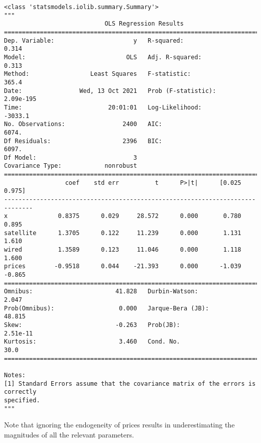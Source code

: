             \begin{tcolorbox}[breakable, size=fbox, boxrule=.5pt, pad at break*=1mm, opacityfill=0]
\begin{Verbatim}[commandchars=\\\{\}]
<class 'statsmodels.iolib.summary.Summary'>
"""
                            OLS Regression Results
==============================================================================
Dep. Variable:                      y   R-squared:                       0.314
Model:                            OLS   Adj. R-squared:                  0.313
Method:                 Least Squares   F-statistic:                     365.4
Date:                Wed, 13 Oct 2021   Prob (F-statistic):          2.09e-195
Time:                        20:01:01   Log-Likelihood:                -3033.1
No. Observations:                2400   AIC:                             6074.
Df Residuals:                    2396   BIC:                             6097.
Df Model:                           3
Covariance Type:            nonrobust
==============================================================================
                 coef    std err          t      P>|t|      [0.025      0.975]
------------------------------------------------------------------------------
x              0.8375      0.029     28.572      0.000       0.780       0.895
satellite      1.3705      0.122     11.239      0.000       1.131       1.610
wired          1.3589      0.123     11.046      0.000       1.118       1.600
prices        -0.9518      0.044    -21.393      0.000      -1.039      -0.865
==============================================================================
Omnibus:                       41.828   Durbin-Watson:                   2.047
Prob(Omnibus):                  0.000   Jarque-Bera (JB):               48.815
Skew:                          -0.263   Prob(JB):                     2.51e-11
Kurtosis:                       3.460   Cond. No.                         30.0
==============================================================================

Notes:
[1] Standard Errors assume that the covariance matrix of the errors is correctly
specified.
"""
\end{Verbatim}
\end{tcolorbox}

    Note that ignoring the endogeneity of prices results in underestimating
the magnitudes of all the relevant parameters.

